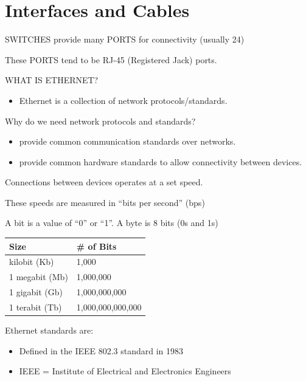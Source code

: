 \chapter{Interfaces and Cables}\label{interfaces-and-cables}

SWITCHES provide many PORTS for connectivity (usually 24)

These PORTS tend to be RJ-45 (Registered Jack) ports.

WHAT IS ETHERNET?

\begin{itemize}
\tightlist
\item
  Ethernet is a collection of network protocols/standards.
\end{itemize}

Why do we need network protocols and standards?

\begin{itemize}
\tightlist
\item
  provide common communication standards over networks.
\item
  provide common hardware standards to allow connectivity between
  devices.
\end{itemize}

Connections between devices operates at a set speed.

These speeds are measured in ``bits per second'' (bps)

A bit is a value of ``0'' or ``1''. A byte is 8 bits (0s and 1s)

{\def\LTcaptype{none} %
\begin{longtable}[]{@{}ll@{}}
\toprule\noalign{}
Size & \# of Bits \\
\midrule\noalign{}
\endhead
\bottomrule\noalign{}
\endlastfoot
1 kilobit (Kb) & 1,000 \\
1 megabit (Mb) & 1,000,000 \\
1 gigabit (Gb) & 1,000,000,000 \\
1 terabit (Tb) & 1,000,000,000,000 \\
\end{longtable}
}

Ethernet standards are:

\begin{itemize}
\tightlist
\item
  Defined in the IEEE 802.3 standard in 1983
\item
  IEEE = Institute of Electrical and Electronics Engineers
\end{itemize}

